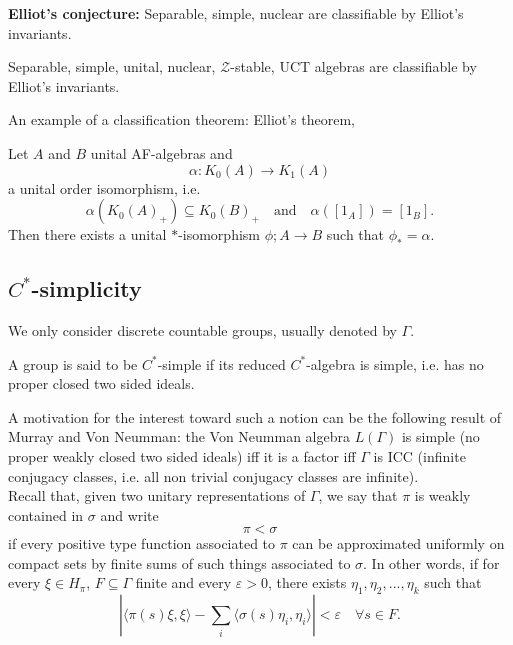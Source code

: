 \textbf{Elliot's conjecture:} Separable, simple, nuclear are classifiable by Elliot's invariants.

\begin{thm}
Separable, simple, unital, nuclear, $\mathcal Z$-stable, UCT algebras are classifiable by Elliot's invariants.
\end{thm}

An example of a classification theorem: Elliot's theorem,

\begin{thm}
Let $A$ and $B$ unital AF-algebras and \[\alpha : K_0(A) \rightarrow K_1(A)\]
a unital order isomorphism, i.e. \[\alpha(K_0(A)_+) \subseteq K_0(B)_+ \quad \text{and} \quad \alpha([1_A])=[1_B].\]
Then there exists a unital $*$-isomorphism $\phi; A\rightarrow B$ such that $\phi_*=\alpha$.
\end{thm}

\subsection{$C^*$-simplicity}

We only consider discrete countable groups, usually denoted by $\Gamma$.

\begin{definition}
A group is said to be $C^*$-simple if its reduced $C^*$-algebra is simple, i.e. has no proper closed two sided ideals. 
\end{definition}

A motivation for the interest toward such a notion can be the following result of Murray and Von Neumman: the Von Neumman algebra $L(\Gamma)$ is simple (no proper weakly closed two sided ideals) iff it is a factor iff $\Gamma$ is ICC (infinite conjugacy classes, i.e. all non trivial conjugacy classes are infinite).\\  

Recall that, given two unitary representations of $\Gamma$, we say that $\pi$ is weakly contained in $\sigma$ and write 
\[\pi < \sigma\]
if every positive type function associated to $\pi$ can be approximated uniformly on compact sets by finite sums of such things associated to $\sigma$. In other words, if for every $\xi \in H_\pi$, $F\subseteq \Gamma$ finite and every $\varepsilon >0$, there exists $ \eta_1, \eta_2, ... , \eta_k$ such that
\[ | \langle \pi(s)\xi, \xi\rangle - \sum_i \langle \sigma (s)\eta_i,\eta_i \rangle| < \varepsilon \quad \forall s\in F.\]

